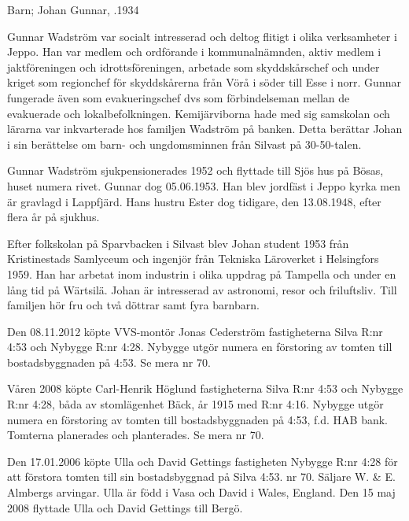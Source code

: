 Barn;	Johan Gunnar, .1934

Gunnar Wadström var socialt intresserad och deltog flitigt i olika verksamheter i Jeppo. Han var medlem och	ordförande 	i kommunalnämnden, aktiv medlem i jaktföreningen och idrottsföreningen, arbetade som skyddskårschef och under kriget som regionchef för skyddskårerna från Vörå i söder till Esse i norr. Gunnar fungerade även som evakueringschef dvs som förbindelseman mellan de evakuerade och lokalbefolkningen. Kemijärviborna hade med sig samskolan och lärarna var inkvarterade hos familjen Wadström på banken. Detta berättar Johan i sin berättelse om barn- och ungdomsminnen från Silvast på 30-50-talen.

Gunnar Wadström sjukpensionerades 1952 och flyttade till Sjös hus på Bösas, huset numera rivet. Gunnar dog 05.06.1953. Han blev jordfäst i Jeppo kyrka men är gravlagd i Lappfjärd. Hans hustru Ester dog tidigare, den 13.08.1948, efter flera år på sjukhus.

Efter folkskolan på Sparvbacken i Silvast blev Johan student 1953 från Kristinestads Samlyceum och ingenjör från Tekniska Läroverket i Helsingfors 1959. Han har arbetat inom industrin i olika uppdrag på Tampella och under en lång tid på Wärtsilä. Johan är intresserad av astronomi,	resor och friluftsliv. Till familjen hör fru och två döttrar samt fyra barnbarn.




Den 08.11.2012 köpte VVS-montör Jonas Cederström fastigheterna Silva R:nr 4:53 och Nybygge R:nr 4:28. Nybygge utgör numera en förstoring av tomten till bostadsbyggnaden på 4:53. Se mera nr 70.

Våren 2008 köpte Carl-Henrik Höglund fastigheterna Silva R:nr 4:53 och Nybygge R:nr 4:28, båda av stomlägenhet Bäck, år 1915 med R:nr 4:16. Nybygge utgör numera en förstoring av tomten till bostadsbyggnaden på 4:53, f.d. HAB bank. Tomterna planerades och planterades. Se mera nr 70.

Den 17.01.2006 köpte Ulla och David Gettings fastigheten Nybygge R:nr 4:28 för att förstora tomten till sin			bostadsbyggnad på Silva 4:53. nr 70. Säljare W. \& E. Almbergs arvingar. Ulla är född i Vasa och David i Wales, 		England. Den 15 maj 2008 flyttade Ulla och David Gettings till Bergö.


